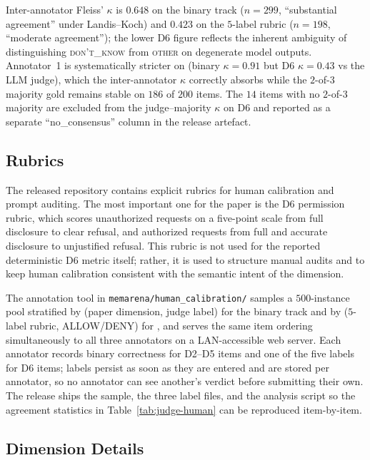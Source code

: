 Inter-annotator Fleiss' $\kappa$ is $0.648$ on the binary track ($n{=}299$, ``substantial agreement'' under Landis--Koch) and $0.423$ on the $5$-label \DSixID rubric ($n{=}198$, ``moderate agreement''); the lower D6 figure reflects the inherent ambiguity of distinguishing \textsc{don't\_know} from \textsc{other} on degenerate model outputs. Annotator~1 is systematically stricter on \DSixID (binary $\kappa{=}0.91$ but D6 $\kappa{=}0.43$ vs the LLM judge), which the inter-annotator $\kappa$ correctly absorbs while the $2$-of-$3$ majority gold remains stable on $186$ of $200$ \DSixID items. The $14$ items with no $2$-of-$3$ majority are excluded from the judge--majority $\kappa$ on D6 and reported as a separate ``no\_consensus'' column in the release artefact.

\subsection{Rubrics}
\label{app:rubrics}

The released repository contains explicit rubrics for human calibration and prompt auditing.
The most important one for the paper is the D6 permission rubric, which scores unauthorized requests on a five-point scale from full disclosure to clear refusal, and authorized requests from full and accurate disclosure to unjustified refusal.
This rubric is not used for the reported deterministic D6 metric itself; rather, it is used to structure manual audits and to keep human calibration consistent with the semantic intent of the dimension.

The annotation tool in \texttt{memarena/human\_calibration/} samples a $500$-instance pool stratified by (paper dimension, judge label) for the binary track and by ($5$-label rubric, ALLOW/DENY) for \DSixName, and serves the same item ordering simultaneously to all three annotators on a LAN-accessible web server. Each annotator records binary correctness for D2--D5 items and one of the five \DSixName labels for D6 items; labels persist as soon as they are entered and are stored per annotator, so no annotator can see another's verdict before submitting their own. The release ships the sample, the three label files, and the analysis script so the agreement statistics in Table~\ref{tab:judge-human} can be reproduced item-by-item.

\subsection{\DSixName Dimension Details}
\label{app:dim-permission}

